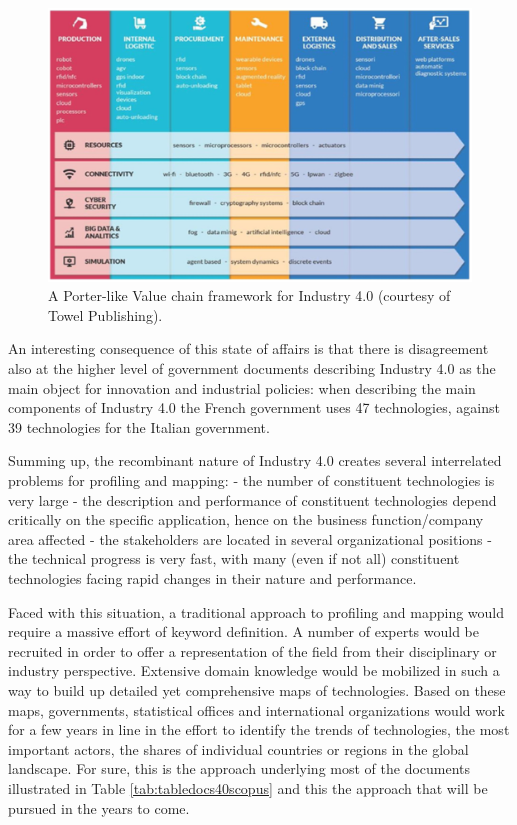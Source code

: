 \documentclass[]{book}
\theoremstyle{definition}
\theoremstyle{definition}
\theoremstyle{definition}
\theoremstyle{remark}
\begin{document}
\begin{figure}

{\centering \includegraphics[width=0.7\linewidth]{_bookdown_files/figures/techvaluechain40} 

}

\caption{A Porter-like Value chain framework for Industry 4.0 (courtesy of Towel Publishing).}\label{fig:techvaluechain40}
\end{figure}

An interesting consequence of this state of affairs is that there is
disagreement also at the higher level of government documents describing
Industry 4.0 as the main object for innovation and industrial policies:
when describing the main components of Industry 4.0 the French
government uses 47 technologies, against 39 technologies for the Italian
government.

Summing up, the recombinant nature of Industry 4.0 creates several
interrelated problems for profiling and mapping: - the number of
constituent technologies is very large - the description and performance
of constituent technologies depend critically on the specific
application, hence on the business function/company area affected - the
stakeholders are located in several organizational positions - the
technical progress is very fast, with many (even if not all) constituent
technologies facing rapid changes in their nature and performance.

Faced with this situation, a traditional approach to profiling and
mapping would require a massive effort of keyword definition. A number
of experts would be recruited in order to offer a representation of the
field from their disciplinary or industry perspective. Extensive domain
knowledge would be mobilized in such a way to build up detailed yet
comprehensive maps of technologies. Based on these maps, governments,
statistical offices and international organizations would work for a few
years in line in the effort to identify the trends of technologies, the
most important actors, the shares of individual countries or regions in
the global landscape. For sure, this is the approach underlying most of
the documents illustrated in Table \ref{tab:tabledocs40scopus} and this
the approach that will be pursued in the years to come.
\end{document}
